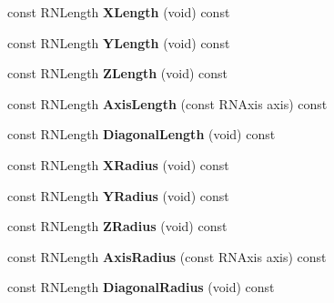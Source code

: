 \begin{DoxyCompactItemize}
\item 
const R\+N\+Length {\bfseries X\+Length} (void) const \hypertarget{class_r3_box_a77662ecb0cd9472cf80aa080ee6abf81}{}\label{class_r3_box_a77662ecb0cd9472cf80aa080ee6abf81}

\item 
const R\+N\+Length {\bfseries Y\+Length} (void) const \hypertarget{class_r3_box_a7948b759ff9108cd8683fdb6beb319fc}{}\label{class_r3_box_a7948b759ff9108cd8683fdb6beb319fc}

\item 
const R\+N\+Length {\bfseries Z\+Length} (void) const \hypertarget{class_r3_box_ab206274e5e0a8a6fa8547c885e643798}{}\label{class_r3_box_ab206274e5e0a8a6fa8547c885e643798}

\item 
const R\+N\+Length {\bfseries Axis\+Length} (const R\+N\+Axis axis) const \hypertarget{class_r3_box_ad8543f4627a228193455fd4d42b3834d}{}\label{class_r3_box_ad8543f4627a228193455fd4d42b3834d}

\item 
const R\+N\+Length {\bfseries Diagonal\+Length} (void) const \hypertarget{class_r3_box_aadd3d7d4162ab84c5b7065ca0b713a16}{}\label{class_r3_box_aadd3d7d4162ab84c5b7065ca0b713a16}

\item 
const R\+N\+Length {\bfseries X\+Radius} (void) const \hypertarget{class_r3_box_ac5ca62a8f40ea3ad44feeacf06cc9b73}{}\label{class_r3_box_ac5ca62a8f40ea3ad44feeacf06cc9b73}

\item 
const R\+N\+Length {\bfseries Y\+Radius} (void) const \hypertarget{class_r3_box_ac8551f4dfc7ffd09fc27ed479a10c05d}{}\label{class_r3_box_ac8551f4dfc7ffd09fc27ed479a10c05d}

\item 
const R\+N\+Length {\bfseries Z\+Radius} (void) const \hypertarget{class_r3_box_aaedb25811c736eeca6efdada04d09df5}{}\label{class_r3_box_aaedb25811c736eeca6efdada04d09df5}

\item 
const R\+N\+Length {\bfseries Axis\+Radius} (const R\+N\+Axis axis) const \hypertarget{class_r3_box_a090d3b76304705244653f687d6ea4a02}{}\label{class_r3_box_a090d3b76304705244653f687d6ea4a02}

\item 
const R\+N\+Length {\bfseries Diagonal\+Radius} (void) const \hypertarget{class_r3_box_ae9154548f38c76780b9eb078201ea107}{}\label{class_r3_box_ae9154548f38c76780b9eb078201ea107}


\end{DoxyCompactItemize}
